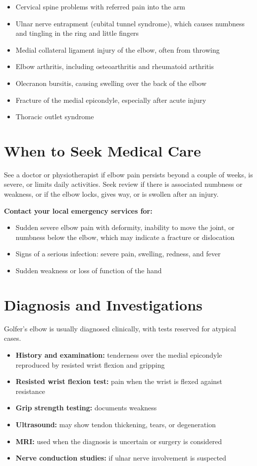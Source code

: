 \begin{itemize}
    \item Cervical spine problems with referred pain into the arm
    \item Ulnar nerve entrapment (cubital tunnel syndrome), which causes numbness and tingling in the ring and little fingers
    \item Medial collateral ligament injury of the elbow, often from throwing
    \item Elbow arthritis, including osteoarthritis and rheumatoid arthritis
    \item Olecranon bursitis, causing swelling over the back of the elbow
    \item Fracture of the medial epicondyle, especially after acute injury
    \item Thoracic outlet syndrome
\end{itemize}

\section*{When to Seek Medical Care}
See a doctor or physiotherapist if elbow pain persists beyond a couple of weeks, is severe, or limits daily activities. Seek review if there is associated numbness or weakness, or if the elbow locks, gives way, or is swollen after an injury.

\textbf{Contact your local emergency services for:}
\begin{itemize}
    \item Sudden severe elbow pain with deformity, inability to move the joint, or numbness below the elbow, which may indicate a fracture or dislocation
    \item Signs of a serious infection: severe pain, swelling, redness, and fever
    \item Sudden weakness or loss of function of the hand
\end{itemize}

\section*{Diagnosis and Investigations}
Golfer's elbow is usually diagnosed clinically, with tests reserved for atypical cases.

\begin{itemize}
    \item \textbf{History and examination:} tenderness over the medial epicondyle reproduced by resisted wrist flexion and gripping
    \item \textbf{Resisted wrist flexion test:} pain when the wrist is flexed against resistance
    \item \textbf{Grip strength testing:} documents weakness
    \item \textbf{Ultrasound:} may show tendon thickening, tears, or degeneration
    \item \textbf{MRI:} used when the diagnosis is uncertain or surgery is considered
    \item \textbf{Nerve conduction studies:} if ulnar nerve involvement is suspected
\end{itemize}

